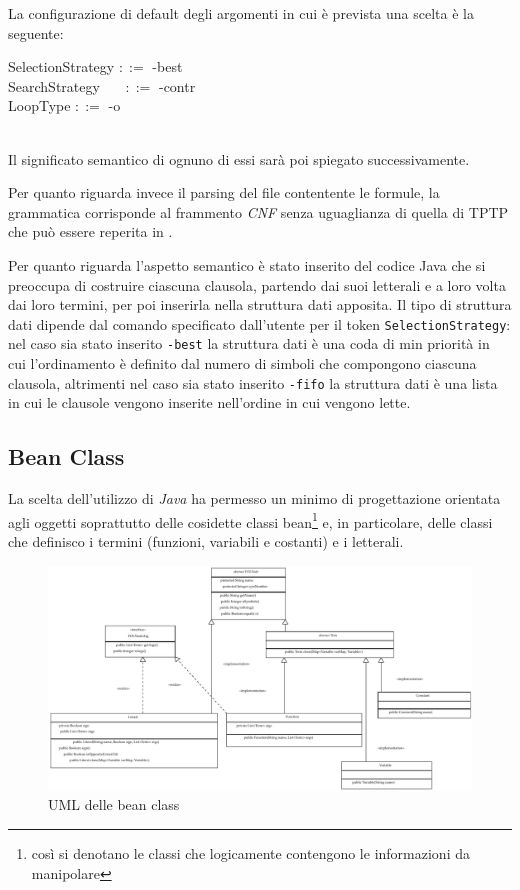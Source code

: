 \documentclass[a4paper,11pt]{article}
\newcommand{\grammarindent}[1][1]{\hspace*{#1\parindent}\ignorespaces}
\begin{document}
La configurazione di default degli argomenti in cui è prevista una scelta è la seguente:\\[1mm]
\begin{ttfamily}
\grammarindent SelectionStrategy $::=$  -best \\
\grammarindent SearchStrategy ~~~$::=$  -contr\\
\grammarindent LoopType $::=$ 	-o \\
\\[1mm]
\end{ttfamily}
Il significato semantico di ognuno di essi sarà poi spiegato successivamente.\par 
Per quanto riguarda invece il parsing del file contentente le formule, la grammatica corrisponde al frammento \emph{CNF} senza uguaglianza di quella di TPTP che può essere reperita in \cite{TPTPsyntax}.\par
Per quanto riguarda l'aspetto semantico è stato inserito del codice Java che si preoccupa di costruire ciascuna clausola, partendo dai suoi letterali e a loro volta dai loro termini, per poi inserirla nella struttura dati apposita. Il tipo di struttura dati dipende dal comando specificato dall'utente per il token \texttt{SelectionStrategy}: nel caso sia stato inserito \texttt{-best} la struttura dati è una coda di min priorità in cui l'ordinamento è definito dal numero di simboli che compongono ciascuna clausola, altrimenti nel caso sia stato inserito \texttt{-fifo} la struttura dati è una lista in cui le clausole vengono inserite nell'ordine in cui vengono lette.

\subsection{Bean Class}
La scelta dell'utilizzo di \emph{Java} ha permesso un minimo di progettazione orientata agli oggetti soprattutto delle cosidette classi bean\footnote{così si denotano le classi che logicamente contengono le informazioni da manipolare} e, in particolare, delle classi che definisco i termini (funzioni, variabili e costanti) e i letterali. 

\begin{figure}[h]
\includegraphics[width=1\columnwidth]{beanClassUML}
\caption{\small{UML delle bean class}}
\label{beanClassUML}
\end{figure}
\end{document}
